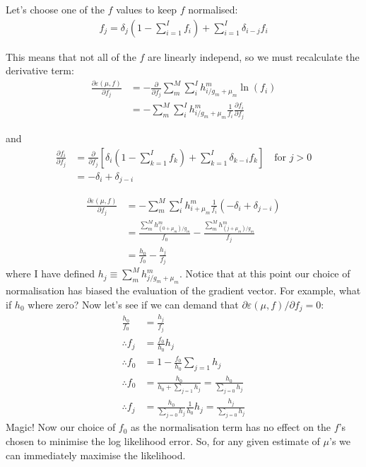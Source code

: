 \documentclass[11pt]{article}
\begin{document}
Let's choose one of the $f$ values to keep $f$ normalised:
\begin{align}
   f_j = \delta_{j} (1 - \sum_{i=1}^I f_i) + \sum_{i=1}^I \delta_{i-j} f_i
\end{align}

This means that not all of the $f$ are linearly independ, so we must recalculate the derivative term:
\begin{align}
   \frac{\partial \varepsilon(\mu, f)}{\partial f_j} &= -\frac{\partial}{\partial f_j} \sum_m^M \sum_i^I h^m_{i/g_m+\mu_m} \ln(f_i) \\
   &= - \sum_m^M \sum_i^I h^m_{i/g_m+\mu_m} \frac{1}{f_i} \frac{\partial f_i}{\partial f_j}
\end{align}

and
\begin{align}
   \frac{\partial f_i}{\partial f_j} &= \frac{\partial }{\partial f_j} \left[ \delta_{i} (1 - \sum_{k=1}^I f_k) + \sum_{k=1}^I \delta_{k-i} f_k \right] \quad \text{for } j > 0 \\
   &= -\delta_{i} + \delta_{j-i}
\end{align}

\begin{align}
   \frac{\partial \varepsilon(\mu, f)}{\partial f_j} &=- \sum_m^M \sum_i^I h^m_{i+\mu_m} \frac{1}{f_i} (-\delta_{i} + \delta_{j-i}) \\
   &= \frac{ \sum_m^M h^m_{(0+\mu_m)/g_m}}{f_0} - \frac{ \sum_m^M h^m_{(j+\mu_m)/g_m}}{f_j} \\
   &= \frac{ h_{0}}{f_0} - \frac{ h_{j}}{f_j}
\end{align}
where I have defined $h_j \equiv \sum_m^M h^m_{j/g_m+\mu_m}$. Notice that at this point our choice of normalisation has biased the evaluation of the gradient vector. For example, what if $h_0$ where zero? Now let's see if we can demand that $\partial \varepsilon(\mu, f) / \partial f_j = 0$:
\begin{align}
   \frac{ h_{0}}{f_0} &= \frac{ h_{j}}{f_j} \\
   \therefore f_j &= \frac{f_0}{h_0} h_j \\
   \therefore f_0 &= 1 -  \frac{f_0}{h_0} \sum_{j=1} h_j \\
   \therefore f_0 &= \frac{h_0}{h_0 + \sum_{j=1} h_j} = \frac{h_0}{\sum_{j=0} h_j} \\
   \therefore f_j &= \frac{h_0}{\sum_{j=0} h_j} \frac{1}{h_0} h_j = \frac{h_j}{\sum_{j=0} h_j}
\end{align}
Magic! Now our choice of $f_0$ as the normalisation term has no effect on the $f$'s chosen to minimise the log likelihood error. So, for any given estimate of $\mu$'s we can immediately maximise the likelihood. 
\end{document}
